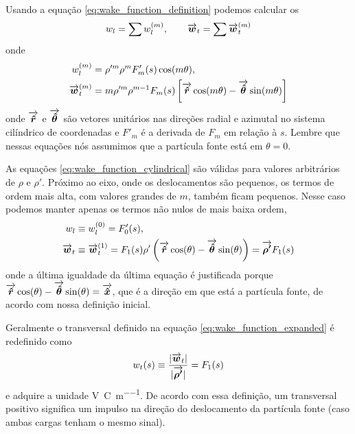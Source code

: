 Usando a equação \eqref{eq:wake_function_definition} podemos calcular os 
\begin{equation}
	w_l = \sum w_l^{(m)}, \qquad \overrightarrow{\boldsymbol{w}}_t = \sum \overrightarrow{\boldsymbol{w}}_t^{(m)}
\end{equation}
onde
\begin{equation}\label{eq:wake_function_cylindrical}\begin{aligned}
w_l^{(m)} &= \rho'^m\rho^mF'_m(s)\cos(m\theta),\\
\overrightarrow{\boldsymbol{w}}_t^{(m)} &= m\rho'^m\rho^{m-1} F_m(s)\left[\overrightarrow{\boldsymbol{\hat{r}}}\cos(m\theta) - 
												  \overrightarrow{\boldsymbol{\hat{\theta}}}\sin(m\theta)\right]
\end{aligned}\end{equation}
onde $\overrightarrow{\boldsymbol{\hat{r}}}$ e $\overrightarrow{\boldsymbol{\hat{\theta}}}$ são vetores unitários nas direções radial e azimutal no sistema cilíndrico de coordenadas e $F'_m$ é a derivada de $F_m$ em relação à $s$. Lembre que nessas equações nós assumimos que a partícula fonte está em $\theta = 0$.

As equações \eqref{eq:wake_function_cylindrical} são válidas para valores arbitrários de $\rho$ e $\rho'$. Próximo ao eixo, onde os deslocamentos são pequenos, os termos de ordem mais alta, com valores grandes de $m$, também ficam pequenos. Nesse caso podemos manter apenas os termos não nulos de mais baixa ordem,
\begin{equation}\label{eq:wake_function_expanded}\begin{aligned}
	w_l & \equiv w_l^{(0)} = F'_0(s), \\
    \overrightarrow{\boldsymbol{w}}_t & \equiv \overrightarrow{\boldsymbol{w}}_t^{(1)} = F_1(s)\rho'\left(\overrightarrow{\boldsymbol{\hat{r}}}\cos(\theta) - \overrightarrow{\boldsymbol{\hat{\theta}}}\sin(\theta)\right) = \overrightarrow{\boldsymbol{\rho'}} F_1(s)
\end{aligned}\end{equation}
onde a última igualdade da última equação é justificada porque $\overrightarrow{\boldsymbol{\hat{r}}}\cos(\theta) - \overrightarrow{\boldsymbol{\hat{\theta}}}\sin(\theta) = \overrightarrow{\boldsymbol{\hat{x}}}$, que é a direção em que está a partícula fonte, de acordo com nossa definição inicial. 

Geralmente o  transversal definido na equação \eqref{eq:wake_function_expanded} é redefinido como
\begin{equation}
	w_t(s) \equiv \frac{|\overrightarrow{\boldsymbol{w}}_t|}{|\overrightarrow{\boldsymbol{\rho'}}|} = F_1(s)
\end{equation}
e adquire a unidade \si{\volt\per\coulomb\per\meter}. De acordo com essa definição, um  transversal positivo significa um impulso na direção do deslocamento da partícula fonte (caso ambas cargas tenham o mesmo sinal).


